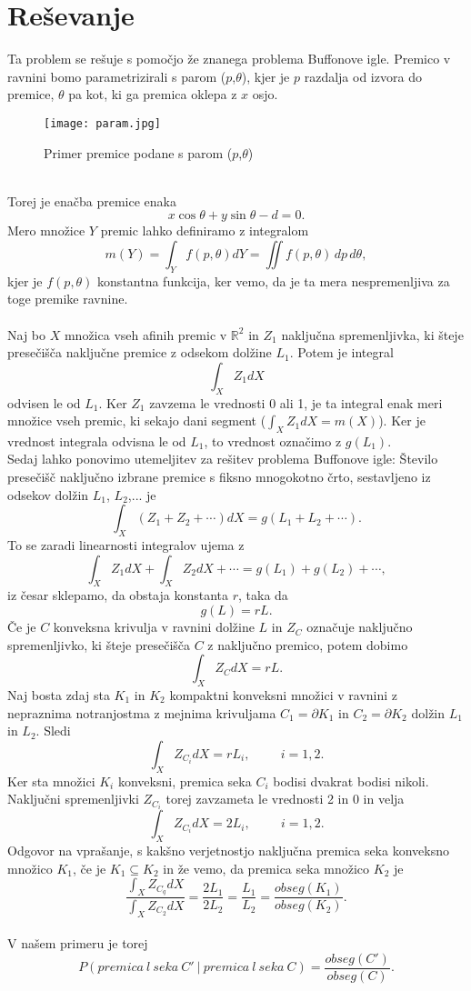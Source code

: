 \documentclass[a4paper,12pt]{article}
\begin{document}
\section{Reševanje}
Ta problem se rešuje s pomočjo že znanega problema Buffonove igle. Premico v ravnini bomo parametrizirali s parom ($p$,$\theta$), kjer je $p$ razdalja od izvora do premice, $\theta$ pa kot, ki ga premica oklepa z $x$ osjo. 
\begin{figure}[h!]
	\begin{center}
		\texttt{[image: param.jpg]}
            \caption{Primer premice podane s parom ($p$,$\theta$)}
	\end{center}
\end{figure}
\\
Torej je enačba premice enaka $$x\cos{\theta}+y\sin{\theta}-d=0.$$
Mero množice $Y$ premic lahko definiramo z integralom $$m(Y)=\int_{Y} f(p,\theta) dY=\iint f(p,\theta)\,dp\,d\theta,$$kjer je $f(p,\theta)$ konstantna funkcija, ker vemo, da je ta mera nespremenljiva za toge premike ravnine.\\
\\
Naj bo $X$ množica vseh afinih premic v $\mathbb{R}^2$ in $Z_1$ naključna spremenljivka, ki šteje presečišča naključne premice z odsekom dolžine $L_1$. Potem je integral $$\int_{X} Z_1 dX $$ odvisen le od $L_1$. Ker $Z_1$ zavzema le vrednosti 0 ali 1, je ta integral enak meri množice vseh
premic, ki sekajo dani segment ($\int_{X} Z_1 dX=m(X)$). Ker je vrednost integrala odvisna le od $L_1$, to vrednost označimo z $g(L_1).$ \\
Sedaj lahko ponovimo utemeljitev za rešitev problema Buffonove igle: Število presečišč naključno izbrane premice s fiksno mnogokotno črto, sestavljeno iz odsekov dolžin $L_1$, $L_2$,... je
$$\int_{X} (Z_1+Z_2+\cdots) dX=g(L_1+L_2+\cdots).$$
To se zaradi linearnosti integralov ujema z 
$$\int_{X} Z_1 dX + \int_{X} Z_2 dX+\cdots=g(L_1)+g(L_2)+\cdots,$$
iz česar sklepamo, da obstaja konstanta $r$, taka da $$g(L)=rL.$$
Če je $C$ konveksna krivulja v ravnini dolžine $L$ in $Z_C$ označuje naključno spremenljivko, ki šteje presečišča $C$ z naključno premico, potem dobimo $$\int_{X} Z_C dX=rL.$$
Naj bosta zdaj sta $K_1$ in $K_2$ kompaktni konveksni množici v ravnini z nepraznima notranjostma z mejnima krivuljama $C_1 =\partial K_1$ in $C_2 =\partial K_2$ dolžin $L_1$ in $L_2$. Sledi $$\int_{X} Z_{C_i} dX=rL_i,\hspace{1cm} i=1,2.$$
Ker sta množici $K_i$ konveksni, premica seka $C_i$ bodisi dvakrat bodisi nikoli. Naključni spremenljivki $Z_{C_i}$ torej zavzameta le vrednosti 2 in 0 in velja  $$\int_{X} Z_{C_i} dX=2L_i,\hspace{1cm} i=1,2.$$
Odgovor na vprašanje, s kakšno verjetnostjo naključna premica seka konveksno množico $K_1$, če je $K_1 \subseteq K_2$ in že vemo, da premica seka množico $K_2$ je $$\frac{\int_{X} Z_{C_q} dX}{\int_{X} Z_{C_2} dX}=\frac{2L_1}{2L_2}=\frac{L_1}{L_2}=\frac{obseg(K_1)}{obseg(K_2)}.$$
\\
V našem primeru je torej 
$$P(premica\ l\ seka\ C'\ |\ premica\ l\ seka\ C)=\frac{obseg(C')}{obseg(C)}.$$
\end{document}
